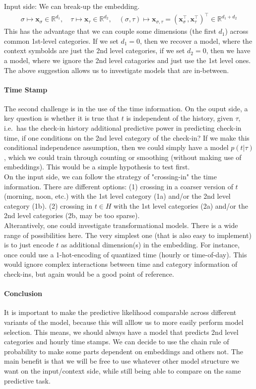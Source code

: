 \documentclass{article}
\newcommand{\x}{{\mathbf x}}
\renewcommand{\Re}{{\mathbb  R}}
\begin{document}
Input side: We can break-up the embedding. 
\begin{align}
\sigma \mapsto \x_\sigma \in \Re^{d_1}, \quad \tau \mapsto \x_\tau \in \Re^{d_2}, 
\quad (\sigma,\tau) \mapsto \x_{\sigma,\tau} = (\x_{\sigma}^\top, \x_{\tau}^\top)^\top \in \Re^{d_1 + d_2} 
\end{align}
This has the advantage that we can couple some dimensions (the first $d_1$) across common 1st-level categories. If we set $d_1=0$, then we recover a model, where the context symbolds are just the 2nd level categories, if we set $d_2=0$, then we have a model, where we ignore the 2nd level catagories and just use the 1st level ones. The above suggestion allows us to investigate models that are in-between.

\paragraph{Time Stamp} The second challenge is in the use of the time information. On the ouput side, a key question is whether it is true that $t$ is independent of the history, given $\tau$, i.e.~has the check-in history additional predictive power in predicting check-in time, if one conditions on the 2nd level category of the check-in? If we make this conditional independence assumption, then we could simply have a model $p(t|\tau)$, which we could train through counting or smoothing (without making use of embeddings). This would be a simple hypothesis to test first.\\

On the input side, we can follow the strategy of "crossing-in" the time information. There are different options: (1) crossing in a coarser version of $t$ (morning, noon, etc.) with the 1st level category (1a) and/or the 2nd level category (1b). (2) crossing in $t \in H$ with the 1st level categories (2a) and/or the 2nd level categories (2b, may be too sparse). \\

Alterantively, one could investigate transformational models. There is a wide range of possibilities here. The very simplest one (that is also easy to implement) is to just encode $t$ as additional dimension(s) in the embedding. For instance, once could use a 1-hot-encoding of quantized time (hourly or time-of-day). This would ignore complex interactions between time and category information of check-ins, but again would be a good point of reference.  

\paragraph{Conclusion}

It is important to make the predictive likelihood comparable across different variants of the model, because this will alllow us to more easily perform model selection. This means, we should always have a model that predicts 2nd level categories and hourly time stamps. We can decide to use the chain rule of probability to make some parts dependent on embeddings and others not. The main benefit is that we will be free to use whatever other model structure we want on the input/context side, while still being able to compare on the same predictive task.
\end{document}
